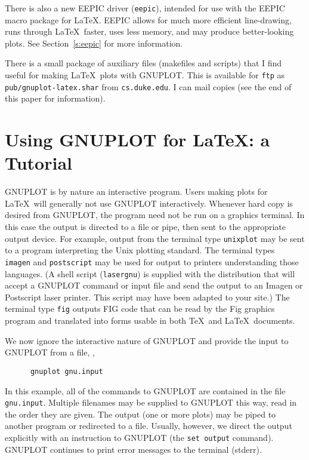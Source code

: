 There is also a new EEPIC driver ({\tt eepic}), intended for use with
the EEPIC macro package for \LaTeX. EEPIC allows for much more
efficient line-drawing, runs through \LaTeX\ faster, uses less memory,
and may produce better-looking plots. See Section~\ref{s:eepic} for
more information.

There is a small package of auxiliary files (makefiles and scripts)
that I find useful for making \LaTeX\ plots with GNUPLOT. This is
available for \verb+ftp+ as \verb+pub/gnuplot-latex.shar+ from
\verb+cs.duke.edu+. I can mail copies (see the end of this paper for
information).

\section{Using GNUPLOT for \LaTeX: a Tutorial}

GNUPLOT is by nature an interactive program. Users making plots for
\LaTeX\ will generally not use GNUPLOT interactively.  Whenever hard
copy is desired from GNUPLOT, the program need not be run on a
graphics terminal. In this case the output is directed to a file or
pipe, then sent to the appropriate output device. For example, output
from the terminal type {\tt unixplot} may be sent to a program
interpreting the Unix plotting standard. The terminal types {\tt
imagen} and {\tt postscript} may be used for output to printers
understanding those languages. (A shell script ({\tt lasergnu}) is
supplied with the distribution that will accept a GNUPLOT command or
input file and send the output to an Imagen or Postscript laser
printer. This script may have been adapted to your site.) The terminal
type {\tt fig} outputs FIG code that can be read by the Fig graphics
program and translated into forms usable in both \TeX\ and
\LaTeX\ documents.

We now ignore the interactive nature of GNUPLOT and provide the input
to GNUPLOT from a file, \ie,
\begin{verbatim}
      gnuplot gnu.input
\end{verbatim}
In this example, all of the commands to GNUPLOT are contained in the
file {\tt gnu.input}. Multiple filenames may be supplied to GNUPLOT
this way, read in the order they are given.  The output (one or more
plots) may be piped to another program or redirected to a file.
Usually, however, we direct the output explicitly with an instruction
to GNUPLOT (the {\tt set output} command). GNUPLOT continues to print
error messages to the terminal (stderr).

